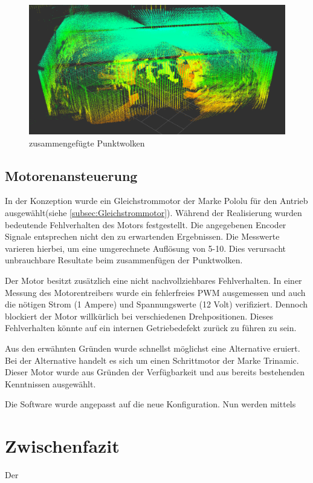 \begin{figure}[H]
	\centering
	\includegraphics[width=1.0\textwidth]{resources/raumausmessung.png}
	\caption[zusammengefügte Punktwolken]{zusammengefügte Punktwolken}
	\label{fig:raumausmessung}
\end{figure}  


\subsection {Motorenansteuerung}
\label{sec:Motorenansteuerung}

In der Konzeption wurde ein Gleichstrommotor der Marke Pololu für den Antrieb ausgewählt(siehe \ref{subsec:Gleichstrommotor}). Während der Realisierung wurden bedeutende Fehlverhalten des Motors festgestellt. Die angegebenen Encoder Signale entsprechen nicht den zu erwartenden Ergebnissen. Die Messwerte varieren hierbei, um eine umgerechnete Auflösung von 5-10. Dies verursacht unbrauchbare Resultate beim zusammenfügen der Punktwolken.

Der Motor besitzt zusätzlich eine nicht nachvollziehbares Fehlverhalten. In einer Messung des Motorentreibers wurde ein fehlerfreies \ac{PWM} ausgemessen und auch die nötigen Strom (1 Ampere) und Spannungswerte (12 Volt) verifiziert. Dennoch blockiert der Motor willkürlich bei verschiedenen Drehpositionen. Dieses Fehlverhalten könnte auf ein internen Getriebedefekt zurück zu führen zu sein. 

Aus den erwähnten Gründen wurde schnellst möglichst eine Alternative eruiert. Bei der Alternative handelt es sich um einen Schrittmotor der Marke Trinamic. Dieser Motor wurde aus Gründen der Verfügbarkeit und aus bereits bestehenden Kenntnissen ausgewählt. 

Die Software wurde angepasst auf die neue Konfiguration. Nun werden mittels 


\section{Zwischenfazit}
\label{sec:ZwischenfazitReal}
Der 
